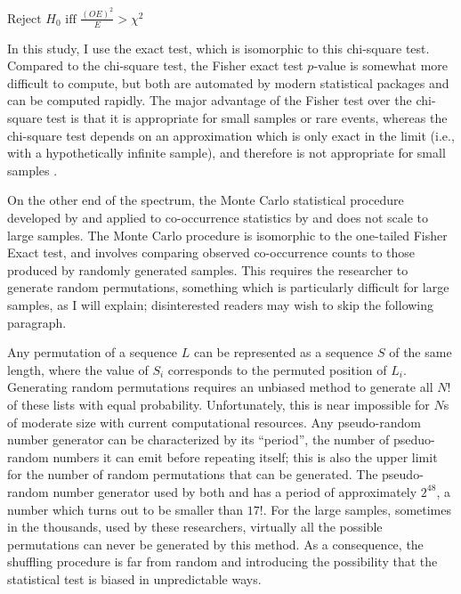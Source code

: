 \begin{example}
$\displaystyle \textrm{Reject } H_0 \textrm{ iff } \frac{(O E) ^ 2}{E} >
χ^2$
\end{example}

  
In this study, I use the \citet{Fisher1934} exact test, which is isomorphic to this chi-square test. Compared to the chi-square test, the Fisher exact test $p$-value is somewhat more difficult to compute, but both are automated by modern statistical packages and can be computed rapidly. The major advantage of the Fisher test over the chi-square test is that it is appropriate for small samples or rare events, whereas the chi-square test depends on an approximation which is only exact in the limit (i.e., with a hypothetically infinite sample), and therefore is not appropriate for small samples \citep[see][]{Gorman2012a}.

On the other end of the spectrum, the Monte Carlo statistical procedure developed by \citet{Kessler2001} and applied to co-occurrence statistics by \citet{Martin2007,Martin2011} and \citet{Brown2010} does not scale to large samples. The Monte Carlo procedure is isomorphic to the one-tailed Fisher Exact test, and involves comparing observed co-occurrence counts to those produced by randomly generated samples.  This requires the researcher to generate random permutations, something which is particularly difficult for large samples, as I will explain; disinterested readers may wish to skip the following paragraph.

Any permutation of a sequence $L$ can be represented as a sequence $S$ of the same length, where the value of $S_i$ corresponds to the permuted position of $L_i$. Generating random permutations requires an unbiased method to generate all $N!$ of these lists with equal probability. Unfortunately, this is near impossible for $N$s of moderate size with current computational resources. Any pseudo-random number generator can be characterized by its ``period'', the number of pseduo-random numbers it can emit before repeating itself; this is also the upper limit for the number of random permutations that can be generated. The pseudo-random number generator used by both \citeauthor{Martin2011} and \citeauthor{Brown2010} has a period of approximately $2^{48}$, a number which turns out to be smaller than $17!$. For the large samples, sometimes in the thousands, used by these researchers, virtually all the possible permutations can never be generated by this method. As a consequence, the shuffling procedure is far from random and introducing the possibility that the statistical test is biased in unpredictable ways.

